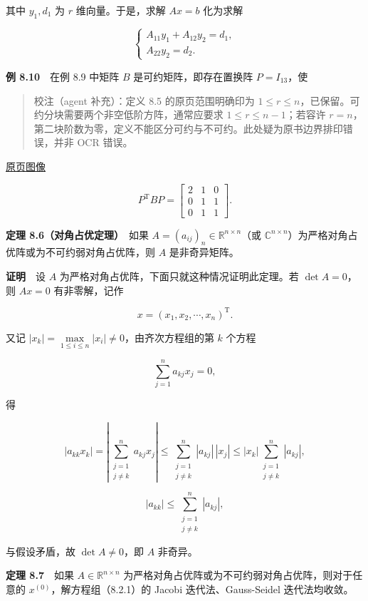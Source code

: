 \documentclass[
  10pt,
  fontset=fandol]{ctexart}
\begin{document}
其中 \(y_1,d_1\) 为 \(r\) 维向量。于是，求解 \(Ax=b\) 化为求解

\[
\begin{cases}
A_{11}y_1+A_{12}y_2=d_1,\\
A_{22}y_2=d_2.
\end{cases}
\]

\textbf{例 8.10}　在例 8.9 中矩阵 \(B\) 是可约矩阵，即存在置换阵 \(P=I_{13}\)，使

\begin{quote}
校注（agent 补充）：定义 8.5 的原页范围明确印为 \(1\leqslant r\leqslant n\)，已保留。可约分块需要两个非空低阶方阵，通常应要求 \(1\leqslant r\leqslant n-1\)；若容许 \(r=n\)，第二块阶数为零，定义不能区分可约与不可约。此处疑为原书边界排印错误，并非 OCR 错误。
\end{quote}

\href{../../source-images/pdf-225.jpeg}{原页图像}

\[
P^{\mathrm T}BP=\left[\begin{array}{c|cc}2&1&0\\\hline0&1&1\\0&1&1\end{array}\right].
\]

\textbf{定理 8.6（对角占优定理）}　如果 \(A=(a_{ij})_n\in\mathbb R^{n\times n}\)（或 \(\mathbb C^{n\times n}\)）为严格对角占优阵或为不可约弱对角占优阵，则 \(A\) 是非奇异矩阵。

\textbf{证明}　设 \(A\) 为严格对角占优阵，下面只就这种情况证明此定理。若 \(\det A=0\)，则 \(Ax=0\) 有非零解，记作

\[
x=(x_1,x_2,\cdots,x_n)^{\mathrm T}.
\]

又记 \(|x_k|=\max\limits_{1\leqslant i\leqslant n}|x_i|\neq0\)，由齐次方程组的第 \(k\) 个方程

\[
\sum_{j=1}^n a_{kj}x_j=0,
\]

得

\[
|a_{kk}x_k|=\left|\sum_{\substack{j=1\\j\neq k}}^n a_{kj}x_j\right|
\leqslant\sum_{\substack{j=1\\j\neq k}}^n|a_{kj}|\,|x_j|
\leqslant|x_k|\sum_{\substack{j=1\\j\neq k}}^n|a_{kj}|,
\]

\[
|a_{kk}|\leqslant\sum_{\substack{j=1\\j\neq k}}^n|a_{kj}|,
\tag{8.3.9}
\]

与假设矛盾，故 \(\det A\neq0\)，即 \(A\) 非奇异。

\textbf{定理 8.7}　如果 \(A\in\mathbb R^{n\times n}\) 为严格对角占优阵或为不可约弱对角占优阵，则对于任意的 \(x^{(0)}\)，解方程组（8.2.1）的 Jacobi 迭代法、Gauss-Seidel 迭代法均收敛。
\end{document}
